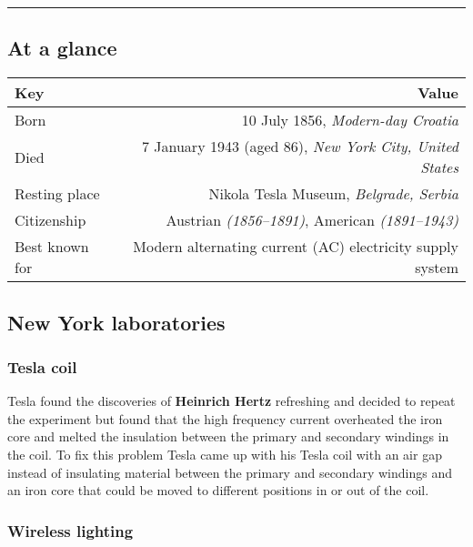 \documentclass[
]{article}
\begin{document}
\begin{center}\rule{0.5\linewidth}{0.5pt}\end{center}

\hypertarget{at-a-glance}{%
\subsection{At a glance}\label{at-a-glance}}

\begin{longtable}[]{@{}lr@{}}
\toprule
Key & Value \\
\midrule
\endhead
Born & 10 July 1856, \emph{Modern-day Croatia} \\
Died & 7 January 1943 (aged 86), \emph{New York City, United States} \\
Resting place & Nikola Tesla Museum, \emph{Belgrade, Serbia} \\
Citizenship & Austrian \emph{(1856--1891)}, American
\emph{(1891--1943)} \\
Best known for & Modern alternating current (AC) electricity supply
system \\
\bottomrule
\end{longtable}

\hypertarget{new-york-laboratories}{%
\subsection{New York laboratories}\label{new-york-laboratories}}

\hypertarget{tesla-coil}{%
\subsubsection{Tesla coil}\label{tesla-coil}}

Tesla found the discoveries of \textbf{Heinrich Hertz} refreshing and
decided to repeat the experiment but found that the high frequency
current overheated the iron core and melted the insulation between the
primary and secondary windings in the coil. To fix this problem Tesla
came up with his Tesla coil with an air gap instead of insulating
material between the primary and secondary windings and an iron core
that could be moved to different positions in or out of the coil.

\hypertarget{wireless-lighting}{%
\subsubsection{Wireless lighting}\label{wireless-lighting}}
\end{document}
